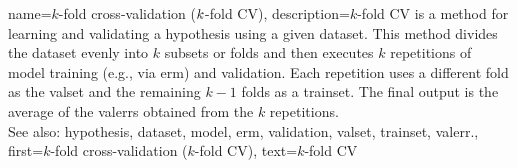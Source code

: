{name={$k$-fold cross-validation ($k$-fold CV)},
	description={$k$-fold CV is a 
		method for learning and validating a \gls{hypothesis} using a given \gls{dataset}. 
		This method divides the \gls{dataset} evenly into $k$ subsets or folds 
		and then executes $k$ repetitions of \gls{model} training (e.g., via \gls{erm}) and \gls{validation}. 
		Each repetition uses a different fold as the \gls{valset} and the remaining $k-1$ folds 
		as a \gls{trainset}. The final output is the average of the \glspl{valerr} obtained 
		from the $k$ repetitions.
				\\
		See also: \gls{hypothesis}, \gls{dataset}, \gls{model}, \gls{erm}, \gls{validation}, \gls{valset}, \gls{trainset}, \gls{valerr}.},
	first={$k$-fold cross-validation ($k$-fold CV)},
	text={$k$-fold CV}
}

